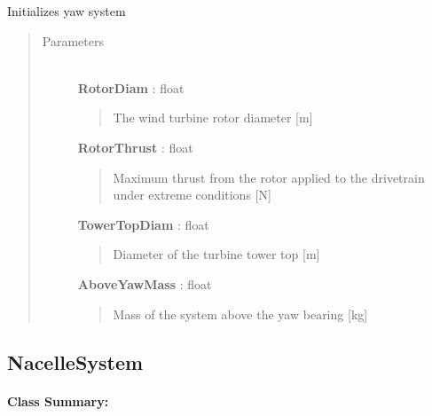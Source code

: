 \documentclass[letterpaper,10pt,openany,oneside]{sphinxmanual}
\begin{document}
\begin{fulllineitems}
\label{documentation:nacelleSE.src.nacelle_components.YawSystem}
Initializes yaw system
\begin{quote}\begin{description}
\item[{Parameters }] \leavevmode\\
\textbf{RotorDiam} : float
\begin{quote}

The wind turbine rotor diameter {[}m{]}
\end{quote}

\textbf{RotorThrust} : float
\begin{quote}

Maximum thrust from the rotor applied to the drivetrain under extreme conditions {[}N{]}
\end{quote}

\textbf{TowerTopDiam} : float
\begin{quote}

Diameter of the turbine tower top {[}m{]}
\end{quote}

\textbf{AboveYawMass} : float
\begin{quote}

Mass of the system above the yaw bearing {[}kg{]}
\end{quote}

\end{description}\end{quote}

\end{fulllineitems}



\subsection{NacelleSystem}
\label{documentation:nacellesystem}\label{documentation:nacellesystem-class-label}\paragraph{Class Summary:}
\end{document}
